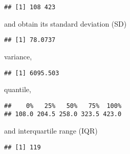 \documentclass[]{book}
\newenvironment{Shaded}{\begin{snugshade}}{\end{snugshade}}
\newcommand{\KeywordTok}[1]{\textcolor[rgb]{0.13,0.29,0.53}{\textbf{{#1}}}}
\newcommand{\NormalTok}[1]{{#1}}
\theoremstyle{definition}
\theoremstyle{definition}
\theoremstyle{remark}
\begin{document}
\begin{Shaded}
\end{Shaded}

\begin{verbatim}
## [1] 108 423
\end{verbatim}

and obtain its standard deviation (SD)

\begin{Shaded}
\end{Shaded}

\begin{verbatim}
## [1] 78.0737
\end{verbatim}

variance,

\begin{Shaded}
\end{Shaded}

\begin{verbatim}
## [1] 6095.503
\end{verbatim}

quantile,

\begin{Shaded}
\end{Shaded}

\begin{verbatim}
##    0%   25%   50%   75%  100% 
## 108.0 204.5 258.0 323.5 423.0
\end{verbatim}

and interquartile range (IQR)

\begin{Shaded}
\end{Shaded}

\begin{verbatim}
## [1] 119
\end{verbatim}
\end{document}
